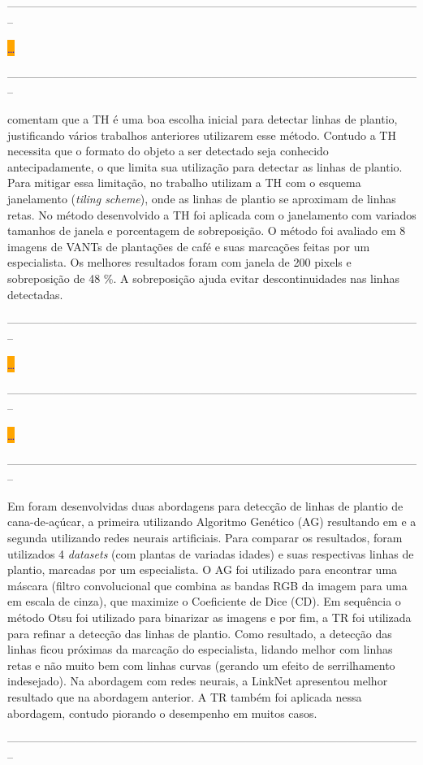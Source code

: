 \documentclass[12pt, a4paper, english, brazil]{article}
\newcommand{\dotsBlue}{\colorbox{orange}{\textcolor{blue}{\dots}}}
\newcommand{\linePage}{--------------------------------------------------------------------------------------------------------------}
\begin{document}
\linePage

 \dotsBlue

\linePage

 comentam que a TH é uma boa escolha inicial para detectar linhas de plantio, justificando vários trabalhos anteriores utilizarem esse método. Contudo a TH necessita que o formato do objeto a ser detectado seja conhecido antecipadamente, o que limita sua utilização para detectar as linhas de plantio. Para mitigar essa limitação, no trabalho utilizam a TH com o esquema janelamento (\textit{tiling scheme}), onde as linhas de plantio se aproximam de linhas retas. No método desenvolvido a TH foi aplicada com o janelamento com variados tamanhos de janela e porcentagem de sobreposição. O método foi avaliado em 8 imagens de VANTs de plantações de café e suas marcações feitas por um especialista. Os melhores resultados foram com janela de 200 pixels e sobreposição de 48 \%. A sobreposição ajuda evitar descontinuidades nas linhas detectadas.

\linePage

 \dotsBlue

\linePage

 \dotsBlue

\linePage

Em  foram desenvolvidas duas abordagens para detecção de linhas de plantio de cana-de-açúcar, a primeira utilizando Algoritmo Genético (AG) resultando em  e a segunda utilizando redes neurais artificiais. Para comparar os resultados, foram utilizados 4 \textit{datasets} (com plantas de variadas idades) e suas respectivas linhas de plantio, marcadas por um especialista. O AG foi utilizado para encontrar uma máscara (filtro convolucional que combina as bandas RGB da imagem para uma em escala de cinza), que maximize o Coeficiente de Dice (CD). Em sequência o método Otsu foi utilizado para binarizar as imagens e por fim, a TR foi utilizada para refinar a detecção das linhas de plantio. Como resultado, a detecção das linhas ficou próximas da marcação do especialista, lidando melhor com linhas retas e não muito bem com linhas curvas (gerando um efeito de serrilhamento indesejado). Na abordagem com redes neurais, a LinkNet apresentou melhor resultado que na abordagem anterior. A TR também foi aplicada nessa abordagem, contudo piorando o desempenho em muitos casos.

\linePage
\end{document}
